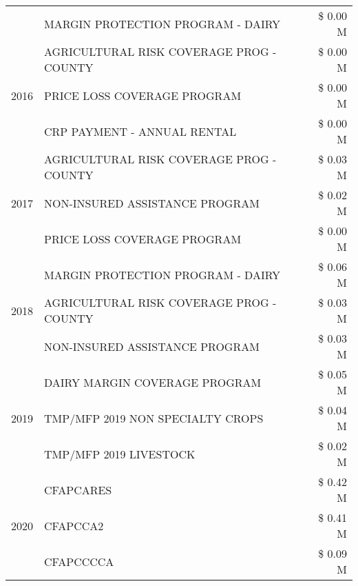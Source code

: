 \begin{tabular}{llr}
 & MARGIN PROTECTION PROGRAM - DAIRY & \$ 0.00 M \\
\cline{1-3}
\multirow[t]{3}{*}{2016} & AGRICULTURAL RISK COVERAGE PROG - COUNTY & \$ 0.00 M \\
 & PRICE LOSS COVERAGE PROGRAM & \$ 0.00 M \\
 & CRP PAYMENT - ANNUAL RENTAL & \$ 0.00 M \\
\cline{1-3}
\multirow[t]{3}{*}{2017} & AGRICULTURAL RISK COVERAGE PROG - COUNTY & \$ 0.03 M \\
 & NON-INSURED ASSISTANCE PROGRAM & \$ 0.02 M \\
 & PRICE LOSS COVERAGE PROGRAM & \$ 0.00 M \\
\cline{1-3}
\multirow[t]{3}{*}{2018} & MARGIN PROTECTION PROGRAM - DAIRY & \$ 0.06 M \\
 & AGRICULTURAL RISK COVERAGE PROG - COUNTY & \$ 0.03 M \\
 & NON-INSURED ASSISTANCE PROGRAM & \$ 0.03 M \\
\cline{1-3}
\multirow[t]{3}{*}{2019} & DAIRY MARGIN COVERAGE PROGRAM & \$ 0.05 M \\
 & TMP/MFP 2019 NON SPECIALTY CROPS & \$ 0.04 M \\
 & TMP/MFP 2019 LIVESTOCK & \$ 0.02 M \\
\cline{1-3}
\multirow[t]{3}{*}{2020} & CFAPCARES & \$ 0.42 M \\
 & CFAPCCA2 & \$ 0.41 M \\
 & CFAPCCCCA & \$ 0.09 M \\
\cline{1-3}
\bottomrule
\end{tabular}
